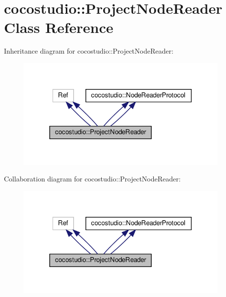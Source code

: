\hypertarget{classcocostudio_1_1ProjectNodeReader}{}\section{cocostudio\+:\+:Project\+Node\+Reader Class Reference}
\label{classcocostudio_1_1ProjectNodeReader}


Inheritance diagram for cocostudio\+:\+:Project\+Node\+Reader\+:
\nopagebreak
\begin{figure}[H]
\begin{center}
\leavevmode
\includegraphics[width=296pt]{classcocostudio_1_1ProjectNodeReader__inherit__graph}
\end{center}
\end{figure}


Collaboration diagram for cocostudio\+:\+:Project\+Node\+Reader\+:
\nopagebreak
\begin{figure}[H]
\begin{center}
\leavevmode
\includegraphics[width=296pt]{classcocostudio_1_1ProjectNodeReader__coll__graph}
\end{center}
\end{figure}
